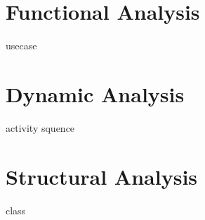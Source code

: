 \section{Functional Analysis}
usecase
\section{Dynamic Analysis}
activity  squence
\section{Structural Analysis}
class